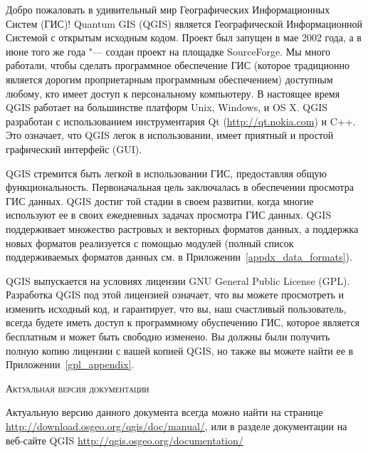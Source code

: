 \mainmatter
\pagestyle{scrheadings}
\label{label_forward}
\setcounter{page}{1}



Добро пожаловать в удивительный мир Географических Информационных Систем
(ГИС)! Quantum GIS (QGIS) является Географической Информационной
Системой с открытым исходным кодом. Проект был запущен в мае 2002 года,
а в июне того же года "--- создан проект на площадке SourceForge. Мы
много работали, чтобы сделать программное обеспечение ГИС (которое
традиционно является дорогим проприетарным программным обеспечением)
доступным любому, кто имеет доступ к персональному компьютеру.
В настоящее время QGIS работает на большинстве платформ Unix, Windows, и
OS X. QGIS разработан с использованием инструментария Qt
(\url{http://qt.nokia.com}) и C++. Это означает, что QGIS легок в
использовании, имеет приятный и простой графический интерфейс (GUI).

QGIS стремится быть легкой в использовании ГИС, предоставляя общую
функциональность. Первоначальная цель заключалась в обеспечении
просмотра ГИС данных. QGIS достиг той стадии в своем развитии, когда
многие используют ее в своих ежедневных задачах просмотра ГИС данных.
QGIS поддерживает множество растровых и векторных форматов данных, а
поддержка новых форматов реализуется с помощью модулей (полный список
поддерживаемых форматов данных см. в Приложении~\ref{appdx_data_formats}).

QGIS выпускается на условиях лицензии GNU General Public License (GPL).
Разработка QGIS под этой лицензией означает, что вы можете просмотреть и
изменить исходный код, и гарантирует, что вы, наш счастливый
пользователь, всегда будете иметь доступ к программному обуспечению ГИС,
которое является бесплатным и может быть свободно изменено. Вы должны
были получить полную копию лицензии с вашей копией QGIS, но также вы
можете найти ее в Приложении~\ref{gpl_appendix}.

\begin{Tip}\caption{\textsc{Актуальная версия документации}}
Актуальную версию данного документа всегда можно найти на странице
\url{http://download.osgeo.org/qgis/doc/manual/}, или в разделе
документации на веб-сайте QGIS \url{http://qgis.osgeo.org/documentation/}
\end{Tip}

\label{label_majfeat}

